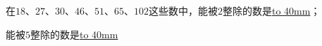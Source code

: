 在$18$、$27$、$30$、$46$、$51$、$65$、$102$这些数中，能被$2$整除的数是\underline{\hbox to 40mm{}}；

能被$5$整除的数是\underline{\hbox to 40mm{}}